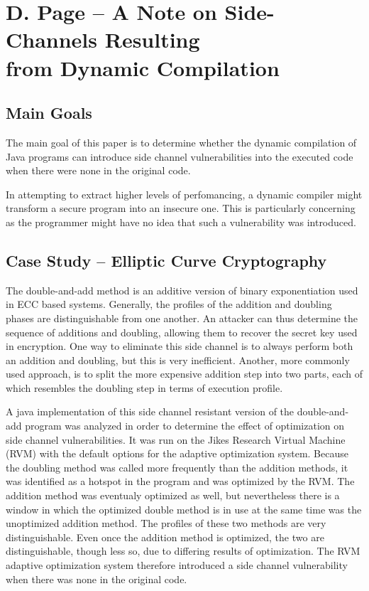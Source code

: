 
\section{D. Page -- A Note on Side-Channels Resulting \\ from Dynamic Compilation}

\subsection{Main Goals}

The main goal of this paper is to determine whether the dynamic compilation of Java programs can
introduce side channel vulnerabilities into the executed code when there were
none in the original code. 

In attempting to extract higher levels of perfomancing, a dynamic compiler
might transform a secure program into an insecure one. This is particularly
concerning as the programmer might have no idea that such a vulnerability was
introduced. 

\subsection{Case Study -- Elliptic Curve Cryptography}

The double-and-add method is an additive version of binary exponentiation used
in ECC based systems. Generally, the profiles of the addition and doubling
phases are distinguishable from one another. An attacker can thus determine the
sequence of additions and doubling, allowing them to recover the
secret key used in encryption. One way to eliminate this side channel is to
always perform both an addition and doubling, but this is very inefficient.
Another, more commonly used approach, is to split the more expensive addition
step into two parts, each of which resembles the doubling step in terms of
execution profile. 

A java implementation of this side channel resistant version of the
double-and-add program was analyzed in order to determine the effect of
optimization on side channel vulnerabilities. It was run on the Jikes Research
Virtual Machine (RVM) with the default options for the adaptive optimization
system.
Because the doubling method was called more frequently than the addition
methods, it was identified as a hotspot in the program and was optimized by the
RVM. The addition method was eventualy optimized as well, but nevertheless
there is a window in which the optimized double method is in use at the same
time was the unoptimized addition method. The profiles of these two methods are
very distinguishable. Even once the addition method is optimized, the two are
distinguishable, though less so, due to differing results of optimization.
The RVM adaptive optimization system therefore introduced a side channel
vulnerability when there was none in the original code. 

